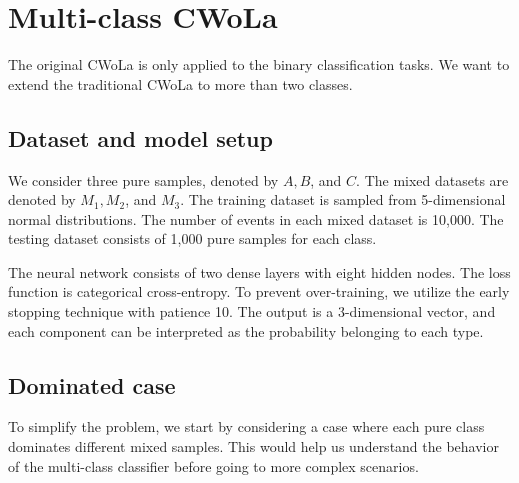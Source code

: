 \documentclass[12pt]{article}
\begin{document}
\section{Multi-class CWoLa}%
\label{sec:multi_class_cwola}
    The original CWoLa is only applied to the binary classification tasks. We want to extend the traditional CWoLa to more than two classes.

    \subsection{Dataset and model setup}%
    \label{sub:dataset_and_model_setup}
        We consider three pure samples, denoted by $A, B$, and $C$. The mixed datasets are denoted by $M_1, M_2$, and $M_3$. The training dataset is sampled from 5-dimensional normal distributions. The number of events in each mixed dataset is 10,000. The testing dataset consists of 1,000 pure samples for each class.

        The neural network consists of two dense layers with eight hidden nodes. The loss function is categorical cross-entropy. To prevent over-training, we utilize the early stopping technique with patience 10. The output is a 3-dimensional vector, and each component can be interpreted as the probability belonging to each type.
    \subsection{Dominated case}%
    \label{sub:dominated_case}
        To simplify the problem, we start by considering a case where each pure class dominates different mixed samples. This would help us understand the behavior of the multi-class classifier before going to more complex scenarios.
\end{document}
